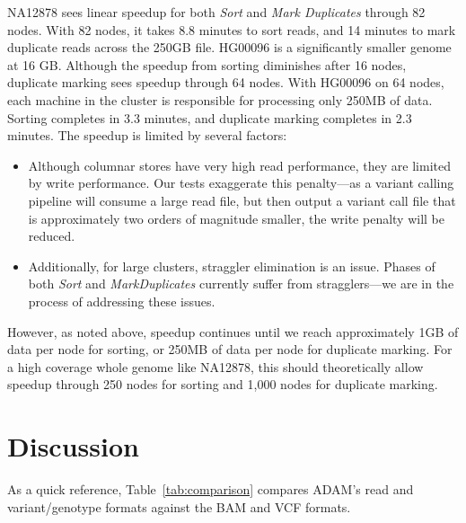 \documentclass{bioinfo}
\begin{document}
NA12878 sees linear speedup for both \textit{Sort} and \textit{Mark Duplicates} through 82 nodes. With 82 nodes, it takes 8.8 minutes to sort reads, and 14 minutes to
mark duplicate reads across the 250GB file. HG00096 is a significantly smaller genome at 16 GB. Although the speedup from sorting diminishes after 16 nodes, duplicate
marking sees speedup through 64 nodes. With HG00096 on 64 nodes, each machine in the cluster is responsible for processing only 250MB of data. Sorting completes in
3.3 minutes, and duplicate marking completes in 2.3 minutes. The speedup is limited by several factors:

\begin{itemize}
\item Although columnar stores have very high read performance, they are limited by write performance. Our tests exaggerate this penalty---as a variant calling pipeline will
consume a large read file, but then output a variant call file that is approximately two orders of magnitude smaller, the write penalty will be reduced.
\item Additionally, for large clusters, straggler elimination is an issue. Phases of both \textit{Sort} and \textit{MarkDuplicates} currently suffer from stragglers---we are in
the process of addressing these issues.
\end{itemize}

However, as noted above, speedup continues until we reach approximately 1GB of data per node for sorting, or 250MB of data per node for duplicate marking. For a high
coverage whole genome like NA12878, this should theoretically allow speedup through 250 nodes for sorting and 1,000 nodes for duplicate marking.

\section{Discussion}
\label{sec:discussion}

As a quick reference, Table~\ref{tab:comparison} compares ADAM's read and variant/genotype formats against the BAM and VCF formats.
\end{document}
